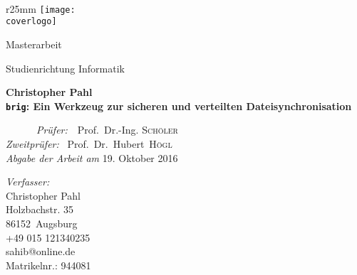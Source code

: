 \documentclass{scrartcl}
\makeatletter
\newcommand{\titel}{\frqq\texttt{brig}\flqq: Ein Werkzeug zur sicheren und verteilten Dateisynchronisation}
\newcommand{\untertitel}{Christopher Pahl}
\newcommand{\art}{Masterarbeit}
\newcommand{\autor}{Christopher Pahl}
\newcommand{\addresse}{Holzbachstr. 35}
\newcommand{\plz}{86152}
\newcommand{\ort}{Augsburg}
\newcommand{\telefon}{+49 015 121340235}
\newcommand{\mail}{sahib@online.de}
\newcommand{\studienbereich}{Informatik}
\newcommand{\matrikelnr}{944081}
\newcommand{\pruefer}{Prof.\ Dr.-Ing. \textsc{Schöler}}
\newcommand{\zweitpruefer}{Prof.\ Dr.\ Hubert\  \textsc{Högl}}
\newcommand{\coverlogo}{./fh-logo.jpg}
\makeatother
\begin{document}
\thispagestyle{plain}
\begin{titlepage}
  \thispagestyle{empty}
  \addtolength{\textwidth}{55mm}
  \addtolength{\oddsidemargin}{-18mm}

  ~
  \begin{wrapfigure}{r}{25mm}
    \vspace{-40mm}
    \texttt{[image: \\coverlogo]}
  \end{wrapfigure}


  \vspace{-1mm}

  \huge{\textcolor{HSAorange}{\selectfont\art}}


  \vspace{10mm}
  \LARGE{Studienrichtung \studienbereich}
  \vspace{20mm}


  \begin{minipage}[t]{0.6\textwidth}
    \begin{center}
    \LARGE{\textbf{\textcolor{dkgray}{\untertitel}}} \\[1.2ex]
    \Huge{\textbf{\textcolor{HSAorange}{\titel}}}\\[1.2ex]
	\end{center}
	\vspace{2cm}
    \Large{\emph{\ \ \ \ \ \ Prüfer:}\ \ \pruefer}\\
    \Large{\emph{Zweitprüfer:} \ \zweitpruefer}\\
	\linebreak
	\linebreak
	\linebreak
	\linebreak
	\linebreak
	\linebreak
	\linebreak
	\linebreak
	\emph{Abgabe der Arbeit am} 19. Oktober 2016\\
  \end{minipage}
  \hspace{0.11\textwidth}
  \begin{minipage}[t]{0.2\textwidth}
    \vspace{7cm}
    \scriptsize
    \emph{Verfasser:}\\
    \autor\\
    \addresse\\
    \plz\ \ort\\
    \telefon\\
    \mail\\
    Matrikelnr.: \matrikelnr\\
    

\end{minipage}
\end{titlepage}
\end{document}
